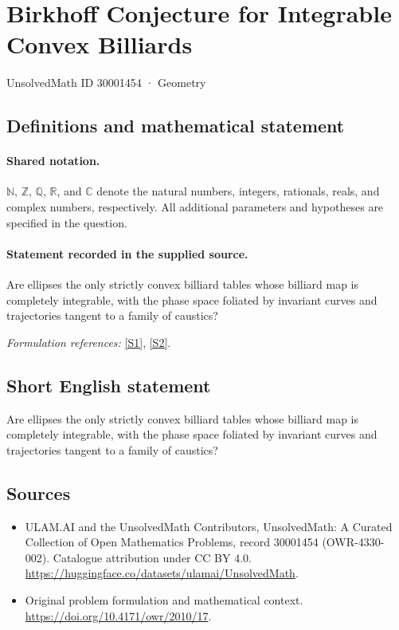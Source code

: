 \documentclass[11pt]{article}
\newcommand{\sref}[2]{\hyperlink{source:#1:#2}{[S#2]}}
\begin{document}
\setcounter{section}{30001453}
\section{Birkhoff Conjecture for Integrable Convex Billiards}\label{30001454}
{\small UnsolvedMath ID 30001454 · Geometry}
\subsection{Definitions and mathematical statement}

\paragraph{Shared notation.}$\mathbb N$, $\mathbb Z$, $\mathbb Q$, $\mathbb R$, and $\mathbb C$ denote the natural numbers, integers, rationals, reals, and complex numbers, respectively. All additional parameters and hypotheses are specified in the question.


\paragraph{Statement recorded in the supplied source.}
Are ellipses the only strictly convex billiard tables whose billiard map is completely integrable, with the phase space foliated by invariant curves and trajectories tangent to a family of caustics?
\par\smallskip\textit{Formulation references:} \sref{30001454}{1}, \sref{30001454}{2}.
\subsection{Short English statement}
Are ellipses the only strictly convex billiard tables whose billiard map is completely integrable, with the phase space foliated by invariant curves and trajectories tangent to a family of caustics?
\subsection{Sources}
\begin{itemize}
\item[\hypertarget{source:30001454:1}{S1}] ULAM.AI and the UnsolvedMath Contributors, UnsolvedMath: A Curated Collection of Open Mathematics Problems, record 30001454 (OWR-4330-002). Catalogue attribution under CC BY 4.0.
\url{https://huggingface.co/datasets/ulamai/UnsolvedMath}.
\item[\hypertarget{source:30001454:2}{S2}] Original problem formulation and mathematical context.
\url{https://doi.org/10.4171/owr/2010/17}.
\end{itemize}
\label{end:30001454}
\end{document}
